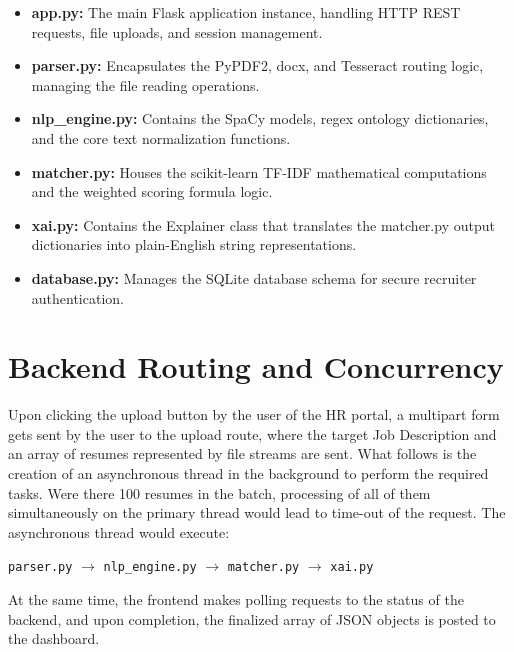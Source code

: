 \begin{itemize}
    \item \textbf{app.py:} The main Flask application instance, handling HTTP REST requests, file uploads, and session management.
    
    \item \textbf{parser.py:} Encapsulates the PyPDF2, docx, and Tesseract routing logic, managing the file reading operations.
    
    \item \textbf{nlp\_engine.py:} Contains the SpaCy models, regex ontology dictionaries, and the core text normalization functions.
    
    \item \textbf{matcher.py:} Houses the scikit-learn TF-IDF mathematical computations and the weighted scoring formula logic.
    
    \item \textbf{xai.py:} Contains the Explainer class that translates the matcher.py output dictionaries into plain-English string representations.
    
    \item \textbf{database.py:} Manages the SQLite database schema for secure recruiter authentication.
\end{itemize}

\section{Backend Routing and Concurrency}
Upon clicking the upload button by the user of the HR portal, a multipart form gets sent by the user to the upload route, where the target Job Description and an array of resumes represented by file streams are sent. What follows is the creation of an asynchronous thread in the background to perform the required tasks. Were there 100 resumes in the batch, processing of all of them simultaneously on the primary thread would lead to time-out of the request. The asynchronous thread would execute:

\begin{center}
\texttt{parser.py} \(\rightarrow\) \texttt{nlp\_engine.py} \(\rightarrow\) \texttt{matcher.py} \(\rightarrow\) \texttt{xai.py}
\end{center}

At the same time, the frontend makes polling requests to the status of the backend, and upon completion, the finalized array of JSON objects is posted to the dashboard.

